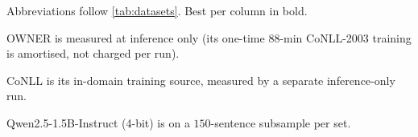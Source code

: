 \begin{table}[H]
\begin{threeparttable}
\begin{tabular}{l*{13}{c}c}
\bottomrule
\end{tabular}
\begin{tablenotes}[flushleft]
\footnotesize
\item Abbreviations follow \autoref{tab:datasets}. Best per column in bold.
\item[$\S$] OWNER is measured at inference only (its one-time $88$-min CoNLL-2003 training is amortised, not charged per run).
\item[$\dagger$] CoNLL is its in-domain training source, measured by a separate inference-only run.
\item[$\ddagger$] Qwen2.5-1.5B-Instruct (4-bit) is on a $150$-sentence subsample per set.
\end{tablenotes}
\end{threeparttable}
\end{table}
